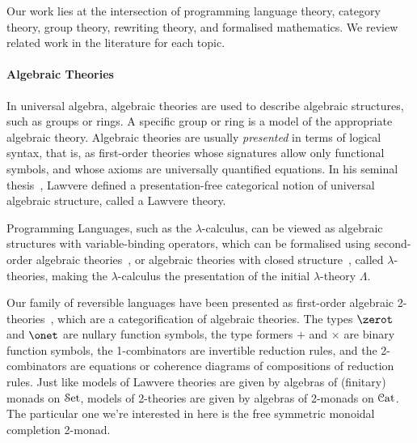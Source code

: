 Our work lies at the intersection of programming language theory, category theory, group theory, rewriting theory, and
formalised mathematics. We review related work in the literature for each topic.

\paragraph{Algebraic Theories} In universal algebra, algebraic theories are used to describe algebraic structures, such
as groups or rings. A specific group or ring is a model of the appropriate algebraic theory. Algebraic theories are
usually \emph{presented} in terms of logical syntax, that is, as first-order theories whose signatures allow only
functional symbols, and whose axioms are universally quantified equations. In his seminal
thesis~\cite{lawvereFUNCTORIALSEMANTICSALGEBRAIC1963}, Lawvere defined a presentation-free categorical notion of
universal algebraic structure, called a Lawvere theory.

Programming Languages, such as the $\lambda$-calculus, can be viewed as algebraic structures with variable-binding
operators, which can be formalised using second-order algebraic theories~\cite{fioreSecondOrderAlgebraicTheories2010},
or algebraic theories with closed structure~\cite{hylandClassicalLambdaCalculus2017}, called $\lambda$-theories, making
the $\lambda$-calculus the presentation of the initial $\lambda$-theory $\Lambda$.

Our family of reversible languages have been presented as first-order algebraic
2-theories~\cite{cohenCoherenceRewriting2theories2009,bekeCategorificationTermRewriting2011,yanofskySyntaxCoherence2000},
which are a categorification of algebraic theories. The types $\zerot$ and $\onet$ are nullary function symbols, the
type formers $+$ and $\times$ are binary function symbols, the 1-combinators are invertible reduction rules, and the
2-combinators are equations or coherence diagrams of compositions of reduction rules. Just like models of Lawvere
theories are given by algebras of (finitary) monads on $\SetCat$, models of 2-theories are given by algebras of 2-monads
on $\CatCat$. The particular one we're interested in here is the free symmetric monoidal completion 2-monad.

